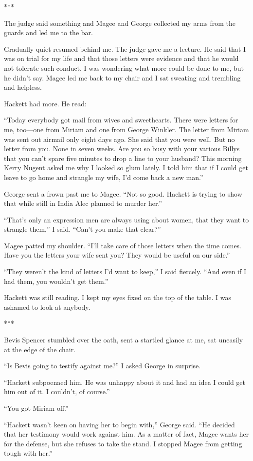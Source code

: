 \documentclass{novel}
\begin{document}
{***

The judge said something and Magee and George collected my arms from the guards and led me to the bar.

Gradually quiet resumed behind me. The judge gave me a lecture. He said that I was on trial for my life and that those letters were evidence and that he would not tolerate such conduct. I was wondering what more could be done to me, but he didn’t say. Magee led me back to my chair and I sat sweating and trembling and helpless.

Hackett had more. He read:

“Today everybody got mail from wives and sweethearts. There were letters for me, too—one from Miriam and one from George Winkler. The letter from Miriam was sent out airmail only eight days ago. She said that you were well. But no letter from you. None in seven weeks. Are you so busy with your various Billys that you can’t spare five minutes to drop a line to your husband? This morning Kerry Nugent asked me why I looked so glum lately. I told him that if I could get leave to go home and strangle my wife, I’d come back a new man.”

George sent a frown past me to Magee. “Not so good. Hackett is trying to show that while still in India Alec planned to murder her.”

“That’s only an expression men are always using about women, that they want to strangle them,” I said. “Can’t you make that clear?”

Magee patted my shoulder. “I’ll take care of those letters when the time comes. Have you the letters your wife sent you? They would be useful on our side.”

“They weren’t the kind of letters I’d want to keep,” I said fiercely. “And even if I had them, you wouldn’t get them.”

Hackett was still reading. I kept my eyes fixed on the top of the table. I was ashamed to look at anybody.

***

Bevis Spencer stumbled over the oath, sent a startled glance at me, sat uneasily at the edge of the chair.

“Is Bevis going to testify against me?” I asked George in surprise.

“Hackett subpoenaed him. He was unhappy about it and had an idea I could get him out of it. I couldn’t, of course.”

“You got Miriam off.”

“Hackett wasn’t keen on having her to begin with,” George said. “He decided that her testimony would work against him. As a matter of fact, Magee wants her for the defense, but she refuses to take the stand. I stopped Magee from getting tough with her.”

}
\end{document}
